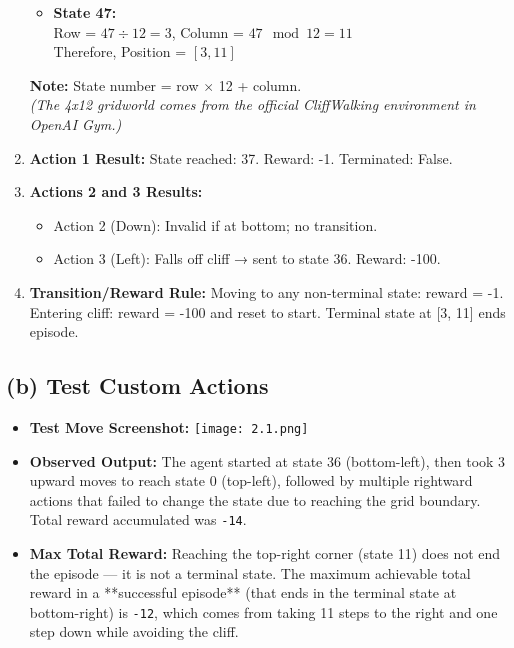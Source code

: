 \documentclass{article}
\begin{document}
\begin{enumerate}[label=(\arabic*)]
\begin{itemize}
        \item \textbf{State 47:} \\
        Row = $47 \div 12 = 3$, \quad Column = $47 \mod 12 = 11$ \\
        Therefore, Position = $[3, 11]$
    \end{itemize}
    \textbf{Note:} State number = row $\times$ 12 + column.\\
    \textit{(The 4x12 gridworld comes from the official CliffWalking environment in OpenAI Gym.)}




    \item \textbf{Action 1 Result:} State reached: 37. Reward: -1. Terminated: False.

    \item \textbf{Actions 2 and 3 Results:} 
    \begin{itemize}
        \item Action 2 (Down): Invalid if at bottom; no transition.
        \item Action 3 (Left): Falls off cliff → sent to state 36. Reward: -100.
    \end{itemize}

    \item \textbf{Transition/Reward Rule:} 
    Moving to any non-terminal state: reward = -1. 
    Entering cliff: reward = -100 and reset to start. 
    Terminal state at [3, 11] ends episode.
\end{enumerate}

\subsection*{(b) Test Custom Actions}
\begin{itemize}
    \item \textbf{Test Move Screenshot:}
    \texttt{[image: 2.1.png]}

    \item \textbf{Observed Output:} 
    The agent started at state 36 (bottom-left), then took 3 upward moves to reach state 0 (top-left), followed by multiple rightward actions that failed to change the state due to reaching the grid boundary. Total reward accumulated was \texttt{-14}.

    \item \textbf{Max Total Reward:} 
    Reaching the top-right corner (state 11) does not end the episode — it is not a terminal state. The maximum achievable total reward in a **successful episode** (that ends in the terminal state at bottom-right) is \texttt{-12}, which comes from taking 11 steps to the right and one step down while avoiding the cliff.
\end{itemize}
\end{document}
